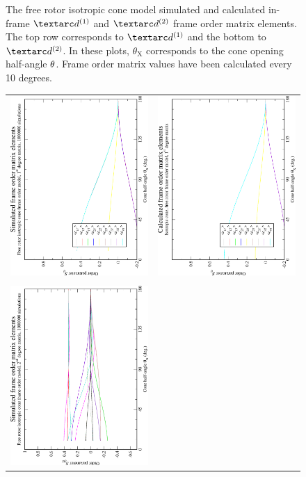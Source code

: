 \begin{figure}
\begin{tabular}{@{}cc@{}}
  \end{tabular}
  \caption[Free-rotor isotropic cone simulated and calculated in-frame $\FOone$ and $\FOtwo$ elements.]{
    The free rotor isotropic cone model simulated and calculated in-frame $\FOone$ and $\FOtwo$ frame order matrix elements.
    The top row corresponds to $\FOone$ and the bottom to $\FOtwo$.
    In these plots, $\theta_\textrm{X}$ corresponds to the cone opening half-angle $\theta$.
    Frame order matrix values have been calculated every 10 degrees.
  }
  \label{fig: simulated and calculated in-frame 1st and 2nd degree iso cone, free rotor frame order}
\end{figure}

\begin{figure}
\centering
  \begin{tabular}{@{}cc@{}}
    \includegraphics[width=.35\textwidth,angle=270]{images/frame_order_matrix/Sij_iso_cone_free_rotor_out_of_frame_theta_x_ens1000000.eps} &
    \includegraphics[width=.35\textwidth,angle=270]{images/frame_order_matrix/Sij_iso_cone_free_rotor_out_of_frame_theta_x_calc.eps} \\
    \\[-5pt]
    \includegraphics[width=.35\textwidth,angle=270]{images/frame_order_matrix/Sijkl_iso_cone_free_rotor_out_of_frame_theta_x_ens1000000.eps} &

\end{tabular}
\end{figure}

